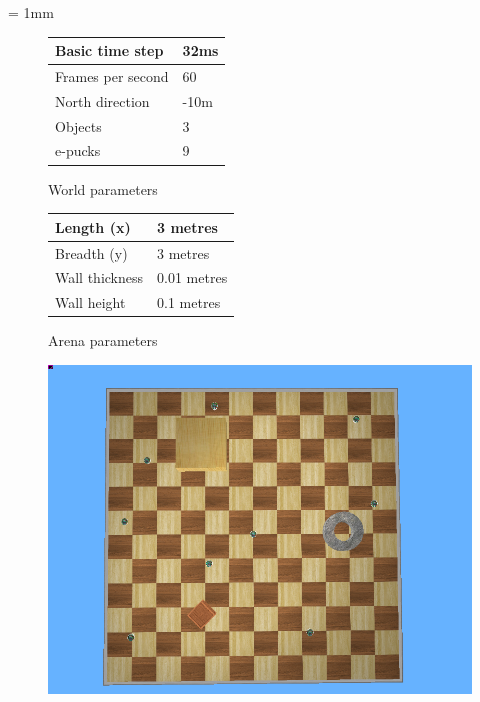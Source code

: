 \tabulinesep = 1mm
\begin{figure}[!h]
	\centering
	\begin{minipage}{.45\textwidth}
		\centering
		\begin{tabu} to .75\textwidth { | X[l] | X[c] | }
			\hline
			Basic time step & 32ms \\
			\hline
			Frames per second & 60 \\
			\hline
			North direction & -10m \\
			\hline
			Objects & 3 \\
			\hline
			e-pucks & 9 \\
			\hline
		\end{tabu}
	\caption{World parameters} 	%
	\label{fig:world-param} 	%
	\end{minipage}
	\begin{minipage}{.45\textwidth}
		\centering
		\begin{tabu} to .75\textwidth { | X[l] | X[c] | }
			\hline
			Length (x) & 3 metres \\
			\hline
			Breadth (y) & 3 metres \\
			\hline
			Wall thickness & 0.01 metres \\
			\hline
			Wall height & 0.1 metres \\
			\hline
		\end{tabu}
	\caption{Arena parameters} 	%
	\label{fig:arena-param} 	%
	\end{minipage}
\end{figure}

\begin{figure}[h]
		\centering
		\includegraphics[width=.6\linewidth]{top-down-simulation}
		\label{fig:arena}
\end{figure}

